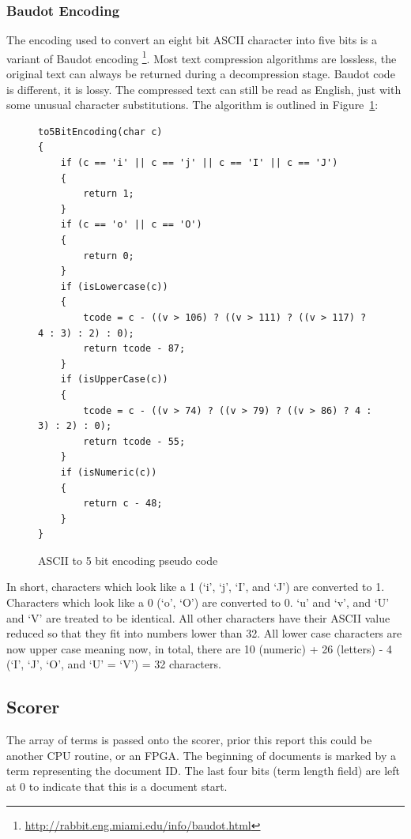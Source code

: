 \subsubsection{Baudot Encoding}

The encoding used to convert an eight bit ASCII character into five bits is a
variant of Baudot encoding
\footnote{\url{http://rabbit.eng.miami.edu/info/baudot.html}}. Most text
compression algorithms are lossless, the original text can always be returned
during a decompression stage. Baudot code is different, it is lossy. The
compressed text can still be read as English, just with some unusual character
substitutions. The algorithm is outlined in Figure~\ref{baudotCode}:

\begin{figure}[H]
\begin{verbatim}
to5BitEncoding(char c)
{
    if (c == 'i' || c == 'j' || c == 'I' || c == 'J')
    {
        return 1;
    }
    if (c == 'o' || c == 'O')
    {
        return 0;
    }
    if (isLowercase(c))
    {
        tcode = c - ((v > 106) ? ((v > 111) ? ((v > 117) ? 4 : 3) : 2) : 0);
        return tcode - 87;
    }
    if (isUpperCase(c))
    {
        tcode = c - ((v > 74) ? ((v > 79) ? ((v > 86) ? 4 : 3) : 2) : 0);
        return tcode - 55;
    }
    if (isNumeric(c))
    {
        return c - 48;
    }
}
\end{verbatim}
\caption{ASCII to 5 bit encoding pseudo code}
\label{baudotCode}
\end{figure}

In short, characters which look like a 1 (`i', `j', `I', and `J') are converted
to 1. Characters which look like a 0 (`o', `O') are converted to 0. `u' and `v',
and `U' and `V' are treated to be identical. All other characters have their
ASCII value reduced so that they fit into numbers lower than 32. All lower case
characters are now upper case meaning now, in total, there are 10 (numeric) + 26
(letters) - 4 (`I', `J', `O', and `U' = `V') = 32 characters.

\subsection{Scorer}

The array of terms is passed onto the scorer, prior this report this could be
another CPU routine, or an FPGA. The beginning of documents is marked by a term
representing the document ID. The last four bits (term length field) are left
at 0 to indicate that this is a document start.

